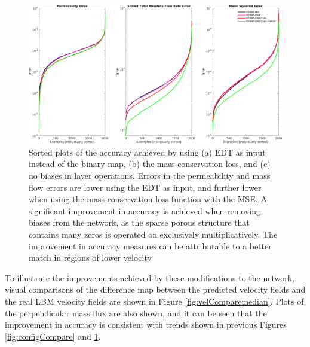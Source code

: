 \documentclass{article}
\begin{document}
\begin{figure}[htp!]
  \centering
    \includegraphics[width=\textwidth]{./figures/velCNNsParamCompare4.png}
    \caption{Sorted plots of the accuracy achieved by using (a) EDT as input instead of the binary map, (b) the mass conservation loss, and (c) no biases in layer operations. Errors in the permeability and mass flow errors are lower using the EDT as input, and further lower when using the mass conservation loss function with the MSE. A significant improvement in accuracy is achieved when removing biases from the network, as the sparse porous structure that contains many zeros is operated on exclusively multiplicatively. The improvement in accuracy measures can be attributable to a better match in regions of lower velocity}
    \label{fig:configCompareDist}
\end{figure}

To illustrate the improvements achieved by these modifications to the network, visual comparisons of the difference map between the predicted velocity fields and the real LBM velocity fields are shown in Figure \ref{fig:velComparemedian}. Plots of the perpendicular mass flux are also shown, and it can be seen that the improvement in accuracy is consistent with trends shown in previous Figures \ref{fig:configCompare} and \ref{fig:configCompareDist}.  
\end{document}
